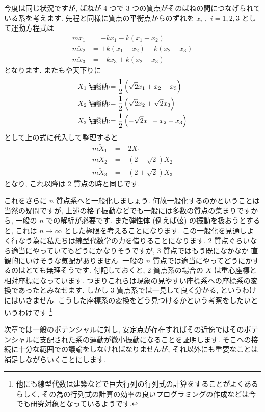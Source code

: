 \documentclass[openany, a4paper, oneside]{book}
\makeatletter
\newcommand*{\defeq}{\mathrel{\rlap{%
\raisebox{0.3ex}{$\m@th\cdot$}}%
\raisebox{-0.3ex}{$\m@th\cdot$}}%
=}
\theoremstyle{break}
\theoremstyle{breakdefn}
\makeatother
\begin{document}
今度は同じ状況ですが, ばねが 4 つで 3 つの質点がそのばねの間につなげられている系を考えます.
先程と同様に質点の平衡点からのずれを $x_{i}\,\,,\,\,i=1,2,3$ として運動方程式は
\begin{align}
m\ddot{x}_{1} &= -kx_1 - k (x_1 - x_2 ) \\
m\ddot{x}_{2} &= + k (x_1 - x_2 ) - k (x_2 - x_3) \\
m\ddot{x}_{3} &= -kx_3 +k (x_2 - x_3 )
\end{align}
となります. またもや天下りに
\begin{align}
X_1 &\defeq \frac{1}{2} \left ( \sqrt{2}x_1 + x_2 - x_3 \right) \\
X_2 &\defeq \frac{1}{2} \left ( \sqrt{2}x_2 + \sqrt{2}x_3 \right) \\
X_3 &\defeq \frac{1}{2} \left ( -\sqrt{2}x_1 + x_2 - x_3 \right)
\end{align}
として上の式に代入して整理すると
\begin{align}
m\ddot{X}_1 &= -2X_1 \\
m\ddot{X}_2 &= -(2 - \sqrt{2}) X_2 \\
m\ddot{X}_3 &= -(2 + \sqrt{2}) X_3
\end{align}
となり, これ以降は 2 質点の時と同じです.

これをさらに $n$ 質点系へと一般化しましょう. 何故一般化するのかということは当然の疑問ですが,
上述の格子振動などでも一般には多数の質点の集まりですから, 一般の $n$ での解析が必要です.
また弾性体 (例えば弦) の振動を扱おうとすると, これは $n\rightarrow \infty$ とした極限を考えることになります.
この一般化を見通しよく行なう為に私たちは線型代数学の力を借りることになります.
2 質点ぐらいなら適当にやっていてもどうにかなりそうですが, 3 質点ではもう既になかなか
直観的にいけそうな気配がありません. 一般の $n$ 質点では適当にやってどうにかするのはとても無理そうです.
付記しておくと,  $2$ 質点系の場合の $X$ は重心座標と相対座標になっています.
つまりこれらは現象の見やすい座標系への座標系の変換であったとみなせます.
しかし $3$ 質点系では一見して良く分かる, というわけにはいきません.
こうした座標系の変換をどう見つけるかという考察をしたいというわけです \footnote{他にも線型代数は建築などで巨大行列の行列式の計算をすることがよくあるらしく,
その為の行列式の計算の効率の良いプログラミングの作成などは今でも研究対象となっているようです.
 }

次章では一般のポテンシャルに対し,
安定点が存在すればその近傍ではそのポテンシャルに支配された系の運動が微小振動になることを証明します.
そこへの接続に十分な範囲での議論をしなければなりませんが, それ以外にも重要なことは補足しながらいくことにします.
\end{document}
